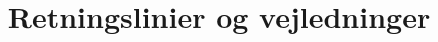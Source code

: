 \documentclass[oneside]{memoir}
\title{Retningslinier og vejledninger}
\begin{document}
\maketitle

\tableofcontents*
\end{document}
